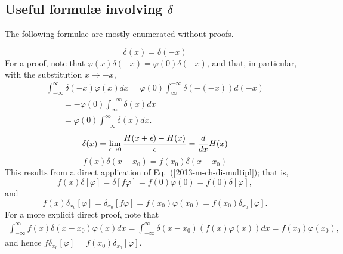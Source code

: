 \subsection{Useful formul\ae{} involving $\delta$}

The following formulae are mostly enumerated without proofs.


 \begin{equation}
 \delta (x)=\delta (-x)
 \end{equation}
{\color{OliveGreen}
\bproof
For a proof, note that $\varphi (x)\delta (-x) = \varphi (0)\delta (-x)$, and that, in particular,
with the substitution $x \rightarrow -x$,
 \begin{equation}
 \begin{split}
\int _{-\infty}^\infty \delta (-x)  \varphi(x) dx   =
 \varphi(0) \int _\infty ^{-\infty}\delta (-(-x))  d(-x) \\ \qquad =
-\varphi(0) \int _\infty ^{-\infty}\delta (x)  d x   \\ \qquad =
\varphi(0) \int _{-\infty}^\infty \delta (x)  d x .
 \end{split}
 \end{equation}
\eproof
}
 \begin{equation}
 \delta (x)=\lim_{\epsilon \rightarrow 0}{H (x+\epsilon )
 -H (x)\over \epsilon }={d\over dx}H (x) \end{equation}
 \begin{equation}
 f (x)\delta (x-x_0)
 =
f (x_0)\delta (x-x_0)
 \end{equation}
{\color{OliveGreen}
\bproof
This results from a direct application of Eq.~(\ref{2013-m-ch-di-multipl}); that is,
 \begin{equation}
f(x) \delta
[\varphi ]
=
\delta
\left[  f  \varphi \right]
=
f(0)\varphi(0) = f(0)   \delta
[\varphi ]
,
 \end{equation}
and
 \begin{equation}
f(x) \delta_{x_0}
[\varphi ]
=
\delta_{x_0}
\left[  f  \varphi \right]
=
f({x_0})\varphi({x_0}) = f({x_0})   \delta_{x_0}
[\varphi ]
.
 \end{equation}
For a more explicit direct proof, note that
 \begin{equation}
 \begin{split}
\int _{-\infty}^\infty f (x)\delta (x-x_0)  \varphi(x) dx
=
\int _{-\infty}^\infty\delta (x-x_0)  ( f (x)\varphi(x) ) dx = f(x_0) \varphi(x_0)
,
 \end{split}
 \end{equation}
and hence $f \delta_{x_0}[ \varphi ] =   f(x_0)\delta_{x_0}[ \varphi ]$.
\eproof
}
